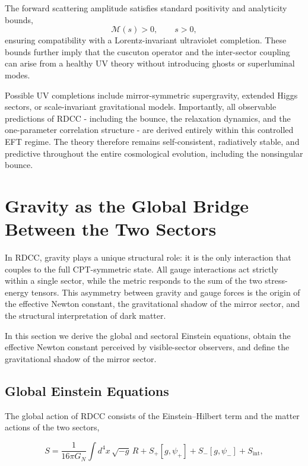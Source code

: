 \documentclass[11pt,a4paper]{article}
\begin{document}
The forward scattering amplitude satisfies standard positivity and analyticity bounds,
\begin{equation}
    \mathcal{M}(s) > 0,
    \qquad s > 0,
\end{equation}
ensuring compatibility with a Lorentz-invariant ultraviolet completion. These bounds
further imply that the cuscuton operator and the inter-sector coupling can arise from a
healthy UV theory without introducing ghosts or superluminal modes.

Possible UV completions include mirror-symmetric supergravity, extended Higgs sectors,
or scale-invariant gravitational models. Importantly, all observable predictions of RDCC
- including the bounce, the relaxation dynamics, and the one-parameter correlation
structure - are derived entirely within this controlled EFT regime. The theory therefore
remains self-consistent, radiatively stable, and predictive throughout the entire cosmological
evolution, including the nonsingular bounce.

\clearpage

\section{Gravity as the Global Bridge Between the Two Sectors}
\label{sec:gravity}

In RDCC, gravity plays a unique structural role: it is the only interaction that
couples to the full CPT-symmetric state. All gauge interactions act strictly
within a single sector, while the metric responds to the sum of the two
stress-energy tensors. This asymmetry between gravity and gauge forces is the
origin of the effective Newton constant, the gravitational shadow of the mirror
sector, and the structural interpretation of dark matter.

In this section we derive the global and sectoral Einstein equations, obtain the
effective Newton constant perceived by visible-sector observers, and define the
gravitational shadow of the mirror sector.

\subsection{Global Einstein Equations}

The global action of RDCC consists of the Einstein--Hilbert term and the matter
actions of the two sectors,

\begin{equation}
S = \frac{1}{16\pi G_{N}}
    \int d^{4}x\,\sqrt{-g}\,R
    + S_{+}[g,\psi_{+}]
    + S_{-}[g,\psi_{-}]
    + S_{\mathrm{int}},
\end{equation}
\end{document}

